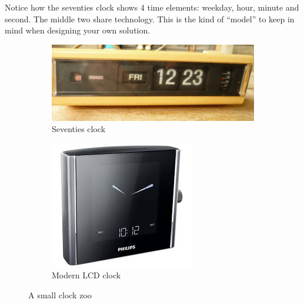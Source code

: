 Notice how the seventies clock shows 4 time elements: weekday, hour,
minute and second. The middle two share technology. This is the kind
of ``model'' to keep in mind when designing your own solution.
\begin{figure}[h]
  \begin{subfigure}{.6\textwidth}\centering
    \includegraphics[width=.9\textwidth]{figures/straightseventiesclock.png}
    \caption{Seventies clock}
  \end{subfigure}
  \begin{subfigure}{.4\textwidth}\centering
    \includegraphics[width=.9\textwidth]{figures/modernclock.jpg}
    \caption{Modern LCD clock}
  \end{subfigure}
  \caption*{A small clock zoo}
\end{figure}
